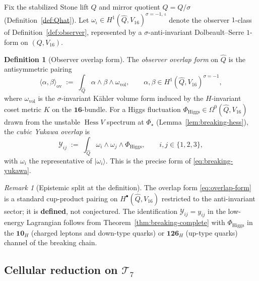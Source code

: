 \documentclass[11pt]{article}
\theoremstyle{plain}
\theoremstyle{definition}
\newtheorem{definition}[theorem]{Definition}
\theoremstyle{remark}
\newtheorem{remark}[theorem]{Remark}
\numberwithin{equation}{section}
\newcommand{\orderparam}{\Phi}
\newcommand{\Hess}{\operatorname{Hess}}
\begin{document}
Fix the stabilized Stone lift $Q$ and mirror quotient $\hat Q=Q/\sigma$
(Definition~\ref{def:Qhat}). Let $\omega_\iota\in
H^1(\hat Q,V_{16})^{\sigma=-1,\,\iota}$ denote the observer $1$-class of
Definition~\ref{def:observer}, represented by a $\sigma$-anti-invariant
Dolbeault--Serre $1$-form on $(Q,V_{16})$.

\begin{definition}[Observer overlap form]\label{def:overlap-form}
The \emph{observer overlap form} on $\hat Q$ is the antisymmetric pairing
\begin{equation}\label{eq:overlap-form}
  \langle\alpha,\beta\rangle_{\mathrm{ov}}
  \;:=\;
  \int_{\hat Q}\alpha\wedge\beta\wedge\omega_{\mathrm{vol}},
  \qquad
  \alpha,\beta\in H^1(\hat Q,V_{16})^{\sigma=-1},
\end{equation}
where $\omega_{\mathrm{vol}}$ is the $\sigma$-invariant K\"ahler volume form
induced by the $H$-invariant coset metric $K$ on the $\mathbf{16}$-bundle.
For a Higgs fluctuation $\Phi_{\mathrm{Higgs}}\in\Omega^0(\hat Q,V_{16})$
drawn from the unstable $\Hess V$ spectrum at $\orderparam_\star$
(Lemma~\ref{lem:breaking-hess}), the \emph{cubic Yukawa overlap} is
\begin{equation}\label{eq:yukawa-overlap}
  \mathcal{Y}_{ij}
  \;:=\;
  \int_{\hat Q}\omega_i\wedge\omega_j\wedge\Phi_{\mathrm{Higgs}},
  \qquad i,j\in\{1,2,3\},
\end{equation}
with $\omega_i$ the representative of $|\omega_i\rangle$. This is the
precise form of \eqref{eq:breaking-yukawa}.
\end{definition}

\begin{remark}[Epistemic split at the definition]
The overlap form \eqref{eq:overlap-form} is a standard cup-product pairing
on $H^\bullet(\hat Q,V_{16})$ restricted to the anti-invariant sector; it is
\textbf{defined}, not conjectured. The identification
$\mathcal{Y}_{ij}=y_{ij}$ in the low-energy Lagrangian follows from
Theorem~\ref{thm:breaking-complete} with $\Phi_{\mathrm{Higgs}}$ in the
$\mathbf{10}_H$ (charged leptons and down-type quarks) or $\mathbf{126}_H$
(up-type quarks) channel of the breaking chain.
\end{remark}

\subsection{Cellular reduction on $\mathcal{T}_7$}
\label{sec:yukawa:cellular}
\end{document}
